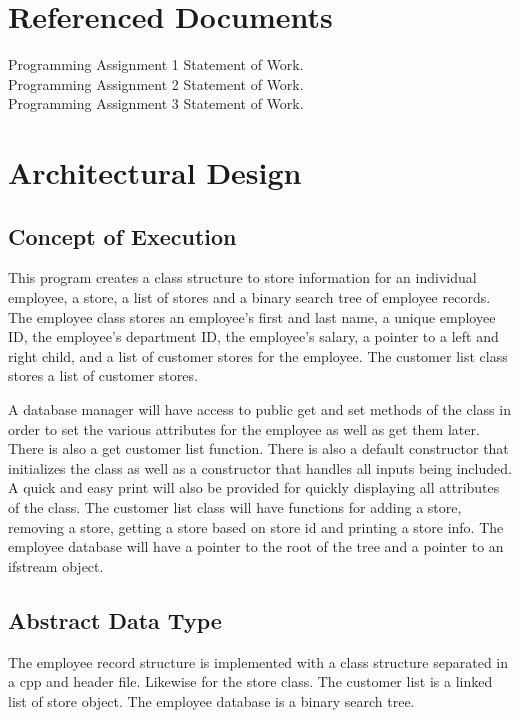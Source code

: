 \documentclass[12pt]{article}%
\begin{document}
\section{Referenced Documents}
Programming Assignment 1 Statement of Work. \\
Programming Assignment 2 Statement of Work. \\
Programming Assignment 3 Statement of Work.

\section{Architectural Design}
\subsection{Concept of Execution}
This program creates a class structure to store information for an
individual employee, a store, a list of stores and a binary search tree of employee records.
The employee class stores an employee's first and last name, a unique employee ID, the employee's department ID, the employee's salary, a pointer to a left and right child, and a list of customer stores for the employee. The customer list class stores a list of customer stores.

A database manager will have access to public get and set methods of the class
in order to set the various attributes for the employee as well as get them later.
There is also a get customer list function.
There is also a default constructor that initializes the class as well as a constructor
that handles all inputs being included. A quick and easy print will also be provided for quickly
displaying all attributes of the class.
The customer list class will have functions
for adding a store, removing a store, getting a store based on store id and printing a store info.
The employee database will have a pointer to the root of the tree and a pointer to an ifstream object.

\subsection{Abstract Data Type}
The employee record structure is implemented with a class structure separated in a cpp and header file. Likewise for the store class. The customer list is a linked list of store object. The employee database is a binary search tree.
\end{document}
